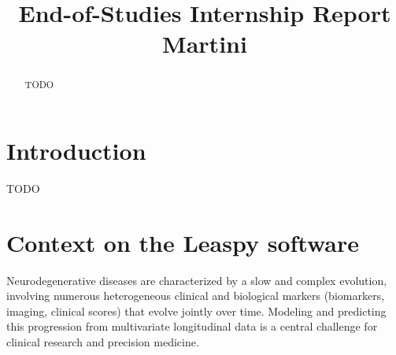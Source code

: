 \documentclass{rapportCS}
\title{End-of-Studies Internship Report Martini}
\begin{document}
 



 

 
 


        
\fairemarges %
\fairepagedegarde %
\setcounter{figure}{0}

\begin{abstract}
        TODO
\end{abstract}
\newpage


\tableofcontents
\newpage   


\section{Introduction} 
TODO  

\newpage 


\section{Context on the Leaspy software}

Neurodegenerative diseases are characterized by a slow and complex evolution, involving numerous heterogeneous clinical and biological markers (biomarkers, imaging, clinical scores) that evolve jointly over time. Modeling and predicting this progression from multivariate longitudinal data is a central challenge for clinical research and precision medicine.
\end{document}
